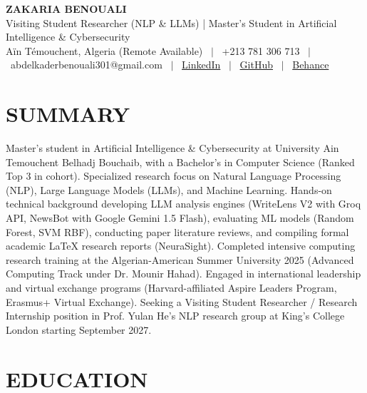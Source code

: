 \documentclass[10.5pt, letterpaper]{article}
\begin{document}
\RaggedRight

\begin{center}
  {\Huge \textbf{ZAKARIA BENOUALI}}\\[4pt]
  {\large Visiting Student Researcher (NLP \& LLMs) | Master's Student in Artificial Intelligence \& Cybersecurity}\\[4pt]
  Aïn Témouchent, Algeria (Remote Available) \ $|$ \ +213 781 306 713 \ $|$ \ abdelkaderbenouali301@gmail.com \ $|$ \ \href{https://www.linkedin.com/in/benouali-abdelkader-yahia-zakaria-4a917a247}{LinkedIn} \ $|$ \ \href{https://github.com/benoualiabdelkader}{GitHub} \ $|$ \ \href{https://www.behance.net/abdelkaderbeno}{Behance}
\end{center}

\vspace{2pt}

\section{SUMMARY}
Master's student in Artificial Intelligence \& Cybersecurity at University Ain Temouchent Belhadj Bouchaib, with a Bachelor's in Computer Science (Ranked Top 3 in cohort). Specialized research focus on Natural Language Processing (NLP), Large Language Models (LLMs), and Machine Learning. Hands-on technical background developing LLM analysis engines (WriteLens V2 with Groq API, NewsBot with Google Gemini 1.5 Flash), evaluating ML models (Random Forest, SVM RBF), conducting paper literature reviews, and compiling formal academic LaTeX research reports (NeuraSight). Completed intensive computing research training at the Algerian-American Summer University 2025 (Advanced Computing Track under Dr. Mounir Hahad). Engaged in international leadership and virtual exchange programs (Harvard-affiliated Aspire Leaders Program, Erasmus+ Virtual Exchange). Seeking a Visiting Student Researcher / Research Internship position in Prof. Yulan He's NLP research group at King's College London starting September 2027.

\section{EDUCATION}
\end{document}
